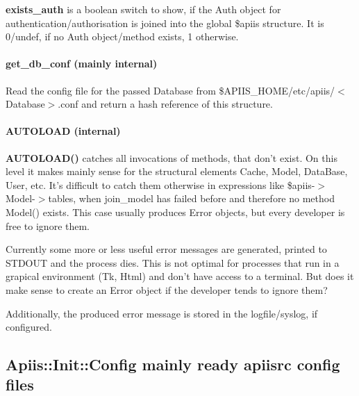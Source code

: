 \textbf{exists\_auth} is a boolean switch to show, if the Auth object for
authentication/authorisation is joined into the global \$apiis structure. It is
0/undef, if no Auth object/method exists, 1 otherwise.

\paragraph*{get\_db\_conf (mainly internal)\label{Apiis::Init_--_Basic_initialisation_object_for_the_complete_APIIS_structure_get_db_conf_mainly_internal_}}


Read the config file for the passed Database from
\$APIIS\_HOME/etc/apiis/$<$Database$>$.conf and return a hash reference of this
structure.

\paragraph*{AUTOLOAD (internal)\label{Apiis::Init_--_Basic_initialisation_object_for_the_complete_APIIS_structure_AUTOLOAD_internal_}}


\textbf{AUTOLOAD()} catches all invocations of methods, that don't exist. On this
level it makes mainly sense for the structural elements Cache, Model,
DataBase, User, etc. It's difficult to catch them otherwise in
expressions like \$apiis-$>$Model-$>$tables, when join\_model has failed before
and therefore no method Model() exists. This case usually produces Error
objects, but every developer is free to ignore them.



Currently some more or less useful error messages are generated, printed
to STDOUT and the process dies. This is not optimal for processes that run
in a grapical environment (Tk, Html) and don't have access to a terminal.
But does it make sense to create an Error object if the developer tends to
ignore them?



Additionally, the produced error message is stored in the logfile/syslog,
if configured.

\subsection{Apiis::Init::Config mainly ready apiisrc config files\label{Apiis::Init::Config_mainly_ready_apiisrc_config_files}}




